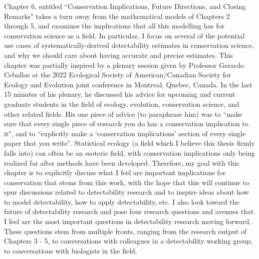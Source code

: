 \par Chapter 6, entitled ``Conservation Implications, Future Directions, and Closing Remarks" takes a turn away from the mathematical models of Chapters 2 through 5, and examines the implications that all this modelling has for conservation science as a field.
In particular, I focus on several of the potential use cases of systematically-derived detectability estimates in conservation science, and why we should care about having accurate and precise estimates.
This chapter was partially inspired by a plenary session given by Professor Gerardo Ceballos at the 2022 Ecological Society of American/Canadian Society for Ecology and Evolution joint conference in Montreal, Quebec, Canada.
In the last 15 minutes of his plenary, he discussed his advice for upcoming and current graduate students in the field of ecology, evolution, conservation science, and other related fields.
His one piece of advice (to paraphrase him) was to ``make sure that every single piece of research you do has a conservation implication to it", and to ``explicitly make a `conservation implications' section of every single paper that you write".
Statistical ecology (a field which I believe this thesis firmly falls into) can often be an esoteric field, with conservation implications only being realized far after methods have been developed.
Therefore, my goal with this chapter is to explicitly discuss what I feel are important implications for conservation that stems from this work, with the hope that this will continue to spur discussions related to detectability research and to inspire ideas about how to model detectability, how to apply detectability, etc.
I also look toward the future of detectability research and pose four research questions and avenues that I feel are the most important questions in detectability research moving forward.
These questions stem from multiple fronts, ranging from the research output of Chapters 3 - 5, to conversations with colleagues in a detectability working group, to conversations with biologists in the field.
